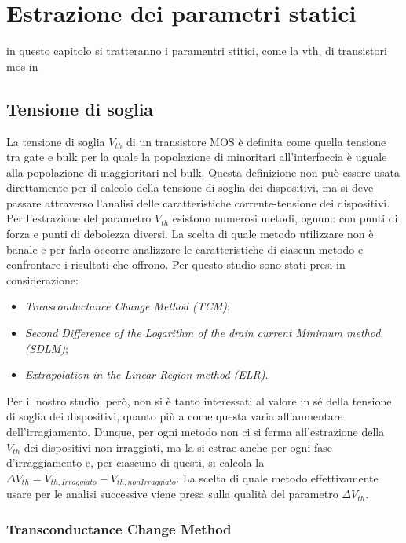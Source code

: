 \documentclass[
	a4paper,
	cleardoublepage=empty,
	headings=twolinechapter,
	numbers=autoenddot,
]{scrbook}
\begin{document}
\chapter{Estrazione dei parametri statici}
in questo capitolo si tratteranno i paramentri stitici, come la vth, di transistori mos in 


\section{Tensione di soglia}

La tensione di soglia $V_{th}$ di un transistore MOS è definita come quella tensione tra gate e bulk per la quale la popolazione di minoritari all'interfaccia è uguale alla popolazione di maggioritari nel bulk. Questa definizione non può essere usata direttamente per il calcolo della tensione di soglia dei dispositivi, ma si deve passare attraverso l'analisi delle caratteristiche corrente-tensione dei dispositivi. \\
Per l'estrazione del parametro $V_{th}$ esistono numerosi metodi, ognuno con punti di forza e punti di debolezza diversi. La scelta di quale metodo utilizzare non è banale e per farla occorre analizzare le caratteristiche di ciascun metodo e confrontare i risultati che offrono. Per questo studio sono stati presi in considerazione:

\begin{itemize}
  \item \emph{Transconductance Change Method (TCM)};
  \item \emph{Second Difference of the Logarithm of the drain current Minimum method (SDLM)};
  \item \emph{Extrapolation in the Linear Region method (ELR)}.
\end{itemize}

Per il nostro studio, però, non si è tanto interessati al valore in sé della tensione di soglia dei dispositivi, quanto più a come questa varia all'aumentare dell'irragiamento. Dunque, per ogni metodo non ci si ferma all'estrazione della $V_{th}$ dei dispositivi non irraggiati, ma la si estrae anche per ogni fase d'irraggiamento e, per ciascuno di questi, si calcola la $\Delta V_{th} = V_{th, Irraggiato}-V_{th, non Irraggiato}$. La scelta di quale metodo effettivamente usare per le analisi successive viene presa sulla qualità del parametro $\Delta V_{th}$.


\subsection{Transconductance Change Method}
\end{document}
